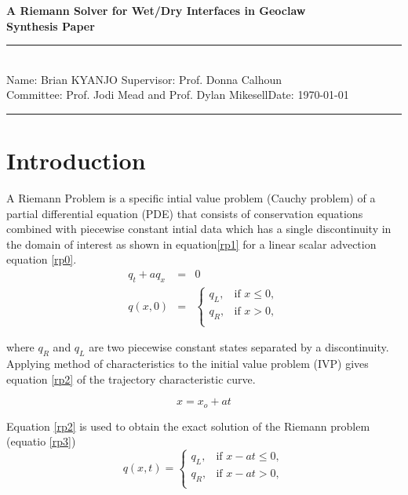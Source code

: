 \documentclass[12pt,a4paper]{article}
\newcommand{\student}{Brian KYANJO }
\newcommand{\course}{Prof. Jodi Mead and Prof. Dylan Mikesell}
\newcommand{\assignment}{ Prof. Donna Calhoun}
\begin{document}
	
	\thispagestyle{empty}
	\begin{center}
		\textbf{A Riemann Solver for Wet/Dry Interfaces in Geoclaw \\[0.5cm]
		Synthesis Paper}
		\vspace{.2cm}
	\end{center}
	
	\noindent
	\rule{17cm}{0.2cm}\\[0.3cm]
	Name: \student \hfill Supervisor: \assignment\\[0.1cm]
	Committee: \course \hfill Date: \today\\
	\rule{17cm}{0.05cm}
	\vspace{.2cm}
	
	\section{Introduction}
	 A Riemann Problem is a specific intial value problem  (Cauchy problem) of a partial differential equation (PDE) that consists of conservation equations combined with piecewise constant intial data which has a single discontinuity in the domain of interest as shown in equation\eqref{rp1} for a  linear scalar advection equation \eqref{rp0}. 
	 \begin{eqnarray}
	 	q_{t} + a q_{x}& =& 0
	 	\label{rp0}\\
	 	q(x,0)& =& \begin{cases}
	 		q_{L}, & \text{if $x \le 0,$}\\
	 		q_{R},& \text{if $x > 0,$}\\
	 		
	 	\end{cases}  
	 	\label{rp1}     
	 \end{eqnarray}
	 
	
	 \noindent where $q_{R}$ and $q_{L}$ are two piecewise constant states separated by a discontinuity. Applying method of characteristics to the initial value problem (IVP) gives  equation \eqref{rp2} of the trajectory characteristic curve.
	 
	 \begin{equation}
	 x = x_{o} + at 
	 \label{rp2}
	 \end{equation}
	
	 
	 \noindent Equation \eqref{rp2} is used to obtain the exact solution of the Riemann problem (equatio \eqref{rp3})
	 \begin{equation}
	 	q(x,t)  = \begin{cases}
	 		q_{L}, & \text{if $x - at \le 0,$}\\
	 		q_{R},& \text{if $x - at > 0,$}\\
	 		
	 	\end{cases}    
    	\label{rp3}   
	 \end{equation}
 
\end{document}
